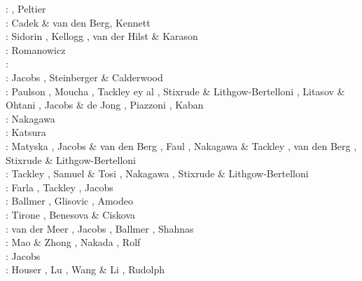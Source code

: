 \begin{scriptsize}
\nineteenninetyseven: \cite{mifo97}, Peltier \etal \cite{pebs97}\\
\nineteenninetyeight: Cadek \& van den Berg\cite{cava98}, Kennett \cite{kenn98}\\
\nineteenninetynine: Sidorin \etal \cite{sigh99}, Kellogg \etal \cite{kehv99}, 
                     van der Hilst \& Karason \cite{vaka99}\\
\nineteenninetyone: Romanowicz \cite{roma01}\\
\twothousandfive: \cite{hett05}\cite{nata05b}\cite{nabu05}\cite{stli05}\cite{stli05b}\\
\twothousandsix: Jacobs \etal \cite{javd06}, Steinberger \& Calderwood \cite{stca06}\\
\twothousandseven: Paulson \etal \cite{pazw07}, Moucha \etal \cite{mofm07}, 
                   Tackley ey al \cite{tanh07}, Stixrude \& Lithgow-Bertelloni \cite{stli07}, 
                   Litasov \& Ohtani \cite{lioh07}, Jacobs \& de Jong \cite{jade07},
                   Piazzoni \etal \cite{pisb07}, Kaban \etal \cite{kart07}\\
\twothousandnine: Nakagawa \etal \cite{natd09}\\
\twothousandten: Katsura \etal \cite{kayy10}\\
\twothousandeleven: Matyska \etal \cite{mayw11}, Jacobs \& van den Berg \cite{java11}, 
                    Faul \etal \cite{faff11}, Nakagawa \& Tackley \cite{nata11}, 
                    van den Berg \etal \cite{vayj11}, Stixrude \& Lithgow-Bertelloni \cite{stli11}\\
\twothousandtwelve: Tackley \cite{tack12}, Samuel \& Tosi \cite{sato12}, 
                    Nakagawa \etal \cite{natd12}, Stixrude \& Lithgow-Bertelloni \cite{stli12}\\
\twothousandthirteen: Farla \etal \cite{fakc13}, Tackley \etal \cite{taab13}, Jacobs \etal \cite{jasv13}\\
\twothousandfifteen: Ballmer \etal \cite{basn15}, Glisovic \etal \cite{glfa15}, Amodeo \etal \cite{amsb15}\\
\twothousandsixteen: Tirone \cite{tiro16}, Benesova \& Ciskova \cite{beci16}\\
\twothousandseventeen: van der Meer \etal \cite{vavs17}, Jacobs \etal \cite{jasv17}, 
                       Ballmer \etal \cite{bahh17}, Shahnas \etal \cite{shyp17,shpj17}\\
\twothousandeighteen: Mao \& Zhong \cite{mazh18}, Nakada \etal \cite{naoi18}, Rolf \etal \cite{roct18}\\
\twothousandnineteen: Jacobs \etal \cite{jasv19}\\
\twothousandtwenty: Houser \etal \cite{hohv20}, Lu \etal{} \cite{lufs20}, Wang \& Li \cite{wali20},
                    Rudolph \etal \cite{ruml20}
\end{scriptsize}


